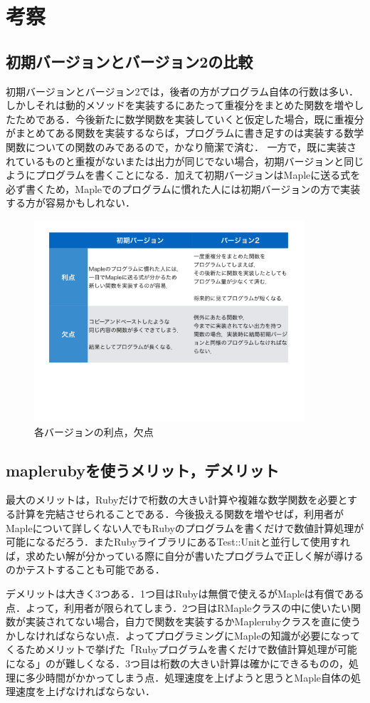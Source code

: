 \section{考察}
\subsection{初期バージョンとバージョン2の比較}
初期バージョンとバージョン2では，後者の方がプログラム自体の行数は多い．しかしそれは動的メソッドを実装するにあたって重複分をまとめた関数を増やしたためである．今後新たに数学関数を実装していくと仮定した場合，既に重複分がまとめてある関数を実装するならば，プログラムに書き足すのは実装する数学関数についての関数のみであるので，かなり簡潔で済む．
一方で，既に実装されているものと重複がないまたは出力が同じでない場合，初期バージョンと同じようにプログラムを書くことになる．加えて初期バージョンはMapleに送る式を必ず書くため，Mapleでのプログラムに慣れた人には初期バージョンの方で実装する方が容易かもしれない．

\begin{figure}[htbp]\begin{center}
\includegraphics[width=10cm,bb= 0 0 737 553]{../figs/./mapleruby_eringi.009.png}
\caption{各バージョンの利点，欠点}
\label{default}\end{center}\end{figure}
\subsection{maplerubyを使うメリット，デメリット}
最大のメリットは，Rubyだけで桁数の大きい計算や複雑な数学関数を必要とする計算を完結させられることである．今後扱える関数を増やせば，利用者がMapleについて詳しくない人でもRubyのプログラムを書くだけで数値計算処理が可能になるだろう．またRubyライブラリにあるTest::Unitと並行して使用すれば，求めたい解が分かっている際に自分が書いたプログラムで正しく解が導けるのかテストすることも可能である．

デメリットは大きく3つある．1つ目はRubyは無償で使えるがMapleは有償である点．よって，利用者が限られてしまう．2つ目はRMapleクラスの中に使いたい関数が実装されてない場合，自力で関数を実装するかMaplerubyクラスを直に使うかしなければならない点．よってプログラミングにMapleの知識が必要になってくるためメリットで挙げた「Rubyプログラムを書くだけで数値計算処理が可能になる」のが難しくなる．3つ目は桁数の大きい計算は確かにできるものの，処理に多少時間がかかってしまう点．処理速度を上げようと思うとMaple自体の処理速度を上げなければならない．

